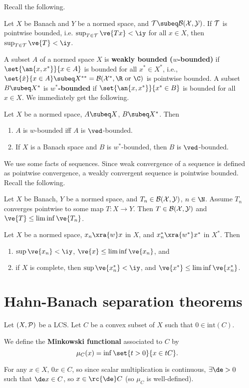 Recall the following.
\begin{thm}
Let $X$ be Banach and $Y$ be a normed space, and $ \cal T\subeq \cal B(X,Y)$. If $\cal T$ is pointwise bounded, i.e. $\sup_{T\in \cal T} \ve{Tx}<\iy$ for all $x\in X$, then $\sup_{T\in \cal T}\ve{T}<\iy$.
\end{thm}
A subset $A$ of a normed space $X$ is \textbf{weakly bounded ($w$-bounded)} if $\set{\an{x,x^*}}{x\in A}$ is bounded for all $x^*\in X^*$, i.e., $\set{\hat x}{x\in A}\subeq X^{**}=\cal B(X^*, \R\text{ or }\C)$ is pointwise bounded. A subset $B\subeq X^*$ is \textbf{$w^*$-bounded} if $\set{\an{x,x^*}}{x^*\in B}$ is bounded for all $x\in X$. We immediately get the following.
\begin{pr}
Let $X$ be a normed space, $A\subeq X$, $B\subeq X^*$. Then
\begin{enumerate}
\item
$A$ is $w$-bounded iff $A$ is $\ved$-bounded.
\item
If $X$ is a Banach space and $B$ is $w^*$-bounded, then $B$ is $\ved$-bounded.
\end{enumerate}
\end{pr}
We use some facts of sequences. Since weak convergence of a sequence is defined as pointwise convergence, a weakly convergent sequence is pointwise bounded. 
Recall the following.
\begin{thm}
Let $X$ be Banach, $Y$ be a normed space, and $T_n\in \cal B(X,Y)$, $n\in \N$. Assume $T_n$ converges pointwise to some map $T:X\to Y$. Then $T\in \cal B(X,Y)$ and $\ve{T}\le \liminf \ve{T_n}$.
\end{thm}
\begin{pr}
Let $X$ be a normed space, $x_n\xra{w} x$ in $X$, and $x_n^*\xra{w^*} x^*$ in $X^*$. Then 
\begin{enumerate}
\item
$\sup\ve{x_n}<\iy$, $\ve{x}\le \liminf\ve{x_n}$, and 
\item
if $X$ is complete, then $\sup\ve{x_n^*}<\iy$, and $\ve{x^*}\le \liminf \ve{x_n^*}$. 
\end{enumerate}
\end{pr}
\section{Hahn-Banach separation theorems}
\begin{df}
Let $(X, \cal P)$ be a LCS. Let $C$ be a convex subset of $X$ such that $0\in \text{int}(C)$. 

We define the \textbf{Minkowski functional} associated to $C$ by 
\[
\mu_C(x)=\inf\set{t>0}{x\in tC}.
\]
\end{df}
For any $x\in X$, $0x\in C$, so since scalar multiplication is continuous, $\exists \de>0$ such that $\de x\in C$, so $x\in \rc{\de}C$ (so $\mu_C$ is well-defined). 

